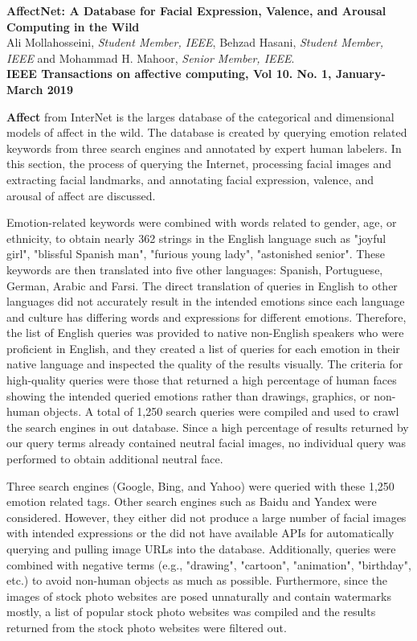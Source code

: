 




\textbf{\large AffectNet: A Database for Facial Expression, Valence, and Arousal Computing in the
Wild}\\
Ali Mollahosseini, \textit{Student Member, IEEE}, Behzad Hasani, \textit{Student Member, IEEE} and
Mohammad H. Mahoor, \textit{Senior Member, IEEE}.\\\textbf{IEEE Transactions on
affective computing, Vol 10. No. 1, January-March 2019}

\textbf{Affect} from InterNet is the larges database of the categorical and dimensional models of
affect in the wild. The database is created by querying emotion related keywords from three
search engines and annotated by expert human labelers. In this section, the process of querying the
Internet, processing facial images and extracting facial landmarks, and annotating facial
expression, valence, and arousal of affect are discussed.

Emotion-related keywords were combined with words related to gender, age, or ethnicity, to obtain
nearly 362 strings in the English language such as "joyful girl", "blissful Spanish man", "furious
young lady", "astonished senior". These keywords are then translated into five other languages:
Spanish, Portuguese, German, Arabic and Farsi. The direct translation of queries in English to
other languages did not accurately result in the intended emotions since each language and
culture has differing words and expressions for different emotions. Therefore, the list of
English queries was provided to native non-English speakers who were proficient in English,
and they created a list of queries for each emotion in their native language and inspected the
quality of the results visually. The criteria for high-quality queries were those that returned
a high percentage of human faces showing the intended queried emotions rather than drawings,
graphics, or non-human objects. A total of 1,250 search queries were compiled and used to crawl the
search engines in out database. Since a high percentage of results returned by our query terms
already contained neutral facial images, no individual query was performed to obtain additional
neutral face.

Three search engines (Google, Bing, and Yahoo) were queried with these 1,250 emotion related tags.
Other search engines such as Baidu and Yandex were considered. However, they either did not produce
a large number of facial images with intended expressions or the did not have available APIs for
automatically querying and pulling image URLs into the database. Additionally, queries were combined
with negative terms (e.g., "drawing", "cartoon", "animation", "birthday", etc.) to avoid non-human
objects as much as possible. Furthermore, since the images of stock photo websites are posed
unnaturally and contain watermarks mostly, a list of popular stock photo websites was compiled and
the results returned from the stock photo websites were filtered out.

